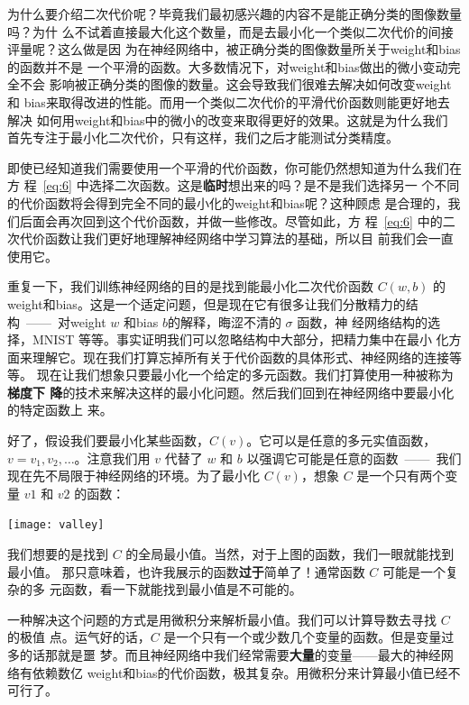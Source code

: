 为什么要介绍二次代价呢？毕竟我们最初感兴趣的内容不是能正确分类的图像数量吗？为什
么不试着直接最大化这个数量，而是去最小化一个类似二次代价的间接评量呢？这么做是因
为在神经网络中，被正确分类的图像数量所关于\gls*{weight}和\gls*{bias}的函数并不是
一个平滑的函数。大多数情况下，对\gls*{weight}和\gls*{bias}做出的微小变动完全不会
影响被正确分类的图像的数量。这会导致我们很难去解决如何改变\gls*{weight}和%
\gls*{bias}来取得改进的性能。而用一个类似二次代价的平滑代价函数则能更好地去解决
如何用\gls*{weight}和\gls*{bias}中的微小的改变来取得更好的效果。这就是为什么我们
首先专注于最小化二次代价，只有这样，我们之后才能测试分类精度。

即使已经知道我们需要使用一个平滑的代价函数，你可能仍然想知道为什么我们在方
程~\eqref{eq:6} 中选择二次函数。这是\textbf{临时}想出来的吗？是不是我们选择另一
个不同的代价函数将会得到完全不同的最小化的\gls*{weight}和\gls*{bias}呢？这种顾虑
是合理的，我们后面会再次回到这个代价函数，并做一些修改。尽管如此，方
程~\eqref{eq:6} 中的二次代价函数让我们更好地理解神经网络中学习算法的基础，所以目
前我们会一直使用它。

重复一下，我们训练神经网络的目的是找到能最小化二次代价函数 $C(w,b)$ 的%
\gls*{weight}和\gls*{bias}。这是一个适定问题，但是现在它有很多让我们分散精力的结
构~——~对\gls*{weight} $w$ 和\gls*{bias} $b$的解释，晦涩不清的 $\sigma$ 函数，神
经网络结构的选择，MNIST 等等。事实证明我们可以忽略结构中大部分，把精力集中在最小
化方面来理解它。现在我们打算忘掉所有关于代价函数的具体形式、神经网络的连接等等。
现在让我们想象只要最小化一个给定的多元函数。我们打算使用一种被称为\textbf{梯度下
  降}的技术来解决这样的最小化问题。然后我们回到在神经网络中要最小化的特定函数上
来。

好了，假设我们要最小化某些函数，$C(v)$。它可以是任意的多元实值函数，$v = v_1,
v_2, \ldots$。注意我们用 $v$ 代替了 $w$ 和 $b$ 以强调它可能是任意的函数~——~我们
现在先不局限于神经网络的环境。为了最小化 $C(v)$，想象 $C$ 是一个只有两个变量
$v1$ 和 $v2$ 的函数：
\begin{center}
  \texttt{[image: valley]}
\end{center}

我们想要的是找到 $C$ 的全局最小值。当然，对于上图的函数，我们一眼就能找到最小值。
那只意味着，也许我展示的函数\textbf{过于}简单了！通常函数 $C$ 可能是一个复杂的多
元函数，看一下就能找到最小值是不可能的。

一种解决这个问题的方式是用微积分来解析最小值。我们可以计算导数去寻找 $C$ 的极值
点。运气好的话，$C$ 是一个只有一个或少数几个变量的函数。但是变量过多的话那就是噩
梦。而且神经网络中我们经常需要\textbf{大量}的变量——最大的神经网络有依赖数亿%
\gls*{weight}和\gls*{bias}的代价函数，极其复杂。用微积分来计算最小值已经不可行了。

